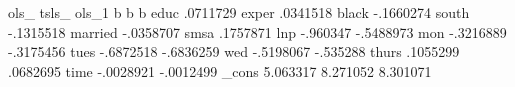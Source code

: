 	ols_	tsls_	ols_1
	b	b	b
educ	.0711729		
exper	.0341518		
black	-.1660274		
south	-.1315518		
married	-.0358707		
smsa	.1757871		
lnp		-.960347	-.5488973
mon		-.3216889	-.3175456
tues		-.6872518	-.6836259
wed		-.5198067	-.535288
thurs		.1055299	.0682695
time		-.0028921	-.0012499
_cons	5.063317	8.271052	8.301071
